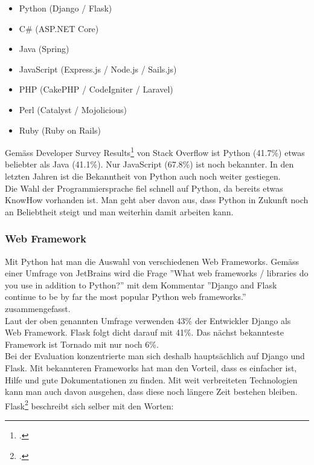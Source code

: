 
\begin{itemize}
	\item Python (Django / Flask)
	\item C\# (ASP.NET Core)
	\item Java (Spring)
	\item JavaScript (Express.js / Node.js / Sails.js)
	\item PHP (CakePHP / CodeIgniter / Laravel)
	\item Perl (Catalyst / Mojolicious)
	\item Ruby (Ruby on Rails)
\end{itemize}


Gemäss Developer Survey Results\footcite{developer_survey_results} von Stack Overflow ist Python (41.7\%) etwas beliebter als Java (41.1\%). Nur JavaScript (67.8\%) ist noch bekannter. In den letzten Jahren ist die Bekanntheit von Python auch noch weiter gestiegen. \\

Die Wahl der Programmiersprache fiel schnell auf Python, da bereits etwas KnowHow vorhanden ist. Man geht aber davon aus, dass Python in Zukunft noch an Beliebtheit steigt und man weiterhin damit arbeiten kann.


\subsubsection*{Web Framework}
Mit Python hat man die Auswahl von verschiedenen Web Frameworks. Gemäss einer Umfrage von JetBrains wird die Frage ''What web frameworks / libraries do you use in addition to Python?'' mit dem Kommentar ''Django and Flask continue to be by far the most popular Python web frameworks.'' zusammengefasst. \\
Laut der oben genannten Umfrage verwenden 43\% der Entwickler  Django als Web Framework. Flask folgt dicht darauf mit 41\%. Das nächst bekannteste Framework ist Tornado mit nur noch 6\%. \\
Bei der Evaluation konzentrierte man sich deshalb hauptsächlich auf Django und Flask. Mit bekannteren Frameworks hat man den Vorteil, dass es einfacher ist, Hilfe und gute Dokumentationen zu finden. Mit weit verbreiteten Technologien kann man auch davon ausgehen, dass diese noch längere Zeit bestehen bleiben.  \\ 

Flask\footcite{flask:foreword} beschreibt sich selber mit den Worten:

